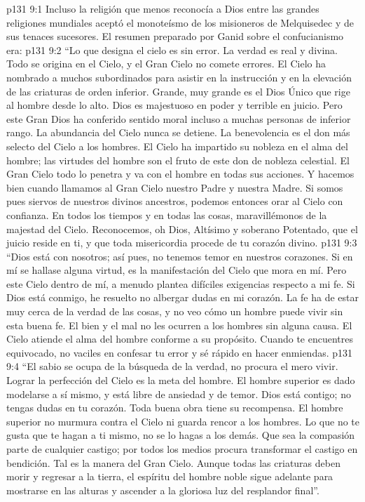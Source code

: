 \vs p131 9:1 Incluso la religión que menos reconocía a Dios entre las grandes religiones mundiales aceptó el monoteísmo de los misioneros de Melquisedec y de sus tenaces sucesores. El resumen preparado por Ganid sobre el confucianismo era:
\vs p131 9:2 \pc “Lo que designa el cielo es sin error. La verdad es real y divina. Todo se origina en el Cielo, y el Gran Cielo no comete errores. El Cielo ha nombrado a muchos subordinados para asistir en la instrucción y en la elevación de las criaturas de orden inferior. Grande, muy grande es el Dios Único que rige al hombre desde lo alto. Dios es majestuoso en poder y terrible en juicio. Pero este Gran Dios ha conferido sentido moral incluso a muchas personas de inferior rango. La abundancia del Cielo nunca se detiene. La benevolencia es el don más selecto del Cielo a los hombres. El Cielo ha impartido su nobleza en el alma del hombre; las virtudes del hombre son el fruto de este don de nobleza celestial. El Gran Cielo todo lo penetra y va con el hombre en todas sus acciones. Y hacemos bien cuando llamamos al Gran Cielo nuestro Padre y nuestra Madre. Si somos pues siervos de nuestros divinos ancestros, podemos entonces orar al Cielo con confianza. En todos los tiempos y en todas las cosas, maravillémonos de la majestad del Cielo. Reconocemos, oh Dios, Altísimo y soberano Potentado, que el juicio reside en ti, y que toda misericordia procede de tu corazón divino.
\vs p131 9:3 “Dios está con nosotros; así pues, no tenemos temor en nuestros corazones. Si en mí se hallase alguna virtud, es la manifestación del Cielo que mora en mí. Pero este Cielo dentro de mí, a menudo plantea difíciles exigencias respecto a mi fe. Si Dios está conmigo, he resuelto no albergar dudas en mi corazón. La fe ha de estar muy cerca de la verdad de las cosas, y no veo cómo un hombre puede vivir sin esta buena fe. El bien y el mal no les ocurren a los hombres sin alguna causa. El Cielo atiende el alma del hombre conforme a su propósito. Cuando te encuentres equivocado, no vaciles en confesar tu error y sé rápido en hacer enmiendas.
\vs p131 9:4 “El sabio se ocupa de la búsqueda de la verdad, no procura el mero vivir. Lograr la perfección del Cielo es la meta del hombre. El hombre superior es dado modelarse a sí mismo, y está libre de ansiedad y de temor. Dios está contigo; no tengas dudas en tu corazón. Toda buena obra tiene su recompensa. El hombre superior no murmura contra el Cielo ni guarda rencor a los hombres. Lo que no te gusta que te hagan a ti mismo, no se lo hagas a los demás. Que sea la compasión parte de cualquier castigo; por todos los medios procura transformar el castigo en bendición. Tal es la manera del Gran Cielo. Aunque todas las criaturas deben morir y regresar a la tierra, el espíritu del hombre noble sigue adelante para mostrarse en las alturas y ascender a la gloriosa luz del resplandor final”.
